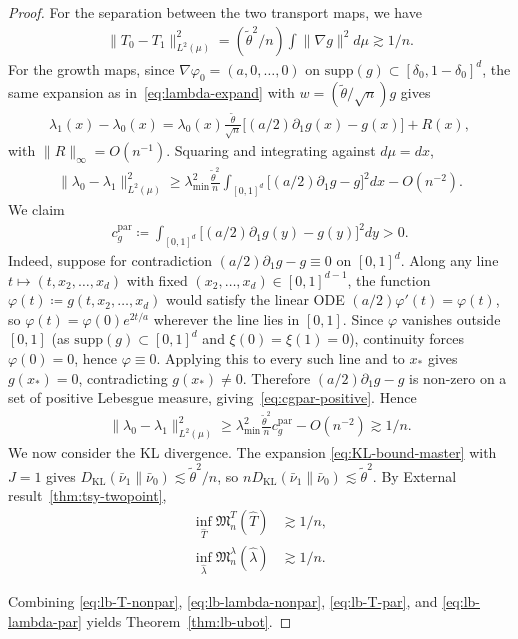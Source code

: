\documentclass[11pt,reqno]{amsart}
\theoremstyle{definition}
\newcommand{\KL}{\mathrm{KL}}
\renewcommand{\hat}{\widehat}
\renewcommand{\tilde}{\widetilde}
\newcommand{\supp}{\mathrm{supp}}
\begin{document}
\begin{proof}
For the separation between the two transport maps, we have
\begin{align}
    \|T_0-T_1\|_{L^2(\mu)}^2
    = (\tilde\theta^2/n) \int \|\nabla g\|^2 d\mu  \gtrsim  1/n.
\end{align}
For the growth maps, since $\nabla \varphi_0=(a,0,\dots,0)$ on $\supp(g)\subset[\delta_0,1-\delta_0]^d$, the same expansion as in~\eqref{eq:lambda-expand} with $w=(\tilde\theta/\sqrt n) g$ gives
\begin{align}
    \lambda_1(x)-\lambda_0(x) = \lambda_0(x) \frac{\tilde\theta}{\sqrt n}\bigl[(a/2)\partial_1 g(x) - g(x)\bigr] + R(x),
\end{align}
with $\|R\|_\infty=O(n^{-1})$. Squaring and integrating against $d\mu=dx$,
\begin{align}
    \|\lambda_0-\lambda_1\|_{L^2(\mu)}^2 \ge \lambda_{\min}^2 \frac{\tilde\theta^2}{n} \int_{[0,1]^d} \bigl[(a/2)\partial_1 g - g\bigr]^2 dx - O(n^{-2}).
\end{align}
We claim
\begin{align}
    \label{eq:cgpar-positive}
    c_g^{\mathrm{par}} \coloneqq \int_{[0,1]^d} \bigl[(a/2)\partial_1 g(y) - g(y)\bigr]^2 dy  >  0.
\end{align}
Indeed, suppose for contradiction $(a/2)\partial_1 g - g\equiv 0$ on $[0,1]^d$. Along any line $t\mapsto (t,x_2,\dots,x_d)$ with fixed $(x_2,\dots,x_d)\in[0,1]^{d-1}$, the function $\varphi(t)\coloneqq g(t,x_2,\dots,x_d)$ would satisfy the linear ODE $(a/2)\varphi'(t)=\varphi(t)$, so $\varphi(t)=\varphi(0)e^{2t/a}$ wherever the line lies in $[0,1]$. Since $\varphi$ vanishes outside $[0,1]$ (as $\supp(g)\subset[0,1]^d$ and $\xi(0)=\xi(1)=0$), continuity forces $\varphi(0)=0$, hence $\varphi\equiv 0$. Applying this to every such line and to $x_*$ gives $g(x_*)=0$, contradicting $g(x_*)\ne 0$. Therefore $(a/2)\partial_1 g - g$ is non-zero on a set of positive Lebesgue measure, giving~\eqref{eq:cgpar-positive}. Hence
\begin{align}
    \|\lambda_0-\lambda_1\|_{L^2(\mu)}^2 \ge \lambda_{\min}^2 \frac{\tilde\theta^2}{n} c_g^{\mathrm{par}} - O(n^{-2})  \gtrsim  1/n.
\end{align}
We now consider the KL divergence. The expansion \eqref{eq:KL-bound-master} with $J=1$ gives $D_\KL(\bar\nu_1\|\bar\nu_0)\lesssim \tilde\theta^2/n$, so $n D_\KL(\bar\nu_1\|\bar\nu_0)\lesssim\tilde\theta^2$. By External result~\ref{thm:tsy-twopoint},
\begin{align}
    \label{eq:lb-T-par}
    \inf_{\hat T} \mathfrak M_n^T(\hat T) & \gtrsim  1/n,\\
    \label{eq:lb-lambda-par}
    \inf_{\hat\lambda} \mathfrak M_n^\lambda(\hat\lambda) & \gtrsim  1/n.
\end{align}

Combining \eqref{eq:lb-T-nonpar}, \eqref{eq:lb-lambda-nonpar}, \eqref{eq:lb-T-par}, and \eqref{eq:lb-lambda-par} yields Theorem~\ref{thm:lb-ubot}.
\end{proof}
\end{document}
